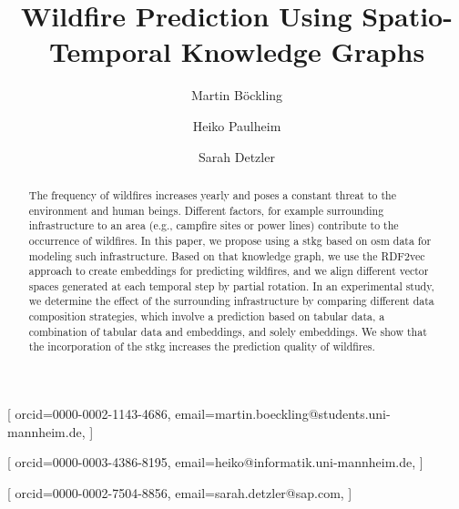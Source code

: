 \documentclass[
]{ceurart}
\begin{document}


\title{Wildfire Prediction Using Spatio-Temporal Knowledge Graphs}

\author[1,2]{Martin B\"ockling}[%
orcid=0000-0002-1143-4686,
email=martin.boeckling@students.uni-mannheim.de,
]
\cormark[1]
\fnmark[1]
\address[1]{University of Mannheim, Data and Web Science Group,
  B6, 26, 68161 Mannheim}
\address[2]{SAP SE,
  Dietmar-Hopp-Allee 16, 69190 Walldorf}

\author[1]{Heiko Paulheim}[%
orcid=0000-0003-4386-8195,
email=heiko@informatik.uni-mannheim.de,
]
\cormark[1]
\fnmark[1]

\author[2]{Sarah Detzler}[%
orcid=0000-0002-7504-8856,
email=sarah.detzler@sap.com,
]
\cormark[1]
\fnmark[1]


\begin{abstract}
  The frequency of wildfires increases yearly and poses a constant threat to the environment and human beings. Different factors, for example surrounding infrastructure to an area (e.g., campfire sites or power lines) contribute to the occurrence of wildfires. In this paper, we propose using a \gls*{stkg} based on \gls*{osm} data for modeling such infrastructure. Based on that knowledge graph, we use the RDF2vec approach to create embeddings for predicting wildfires, and we align different vector spaces generated at each temporal step by partial rotation. In an experimental study, we determine the effect of the surrounding infrastructure by comparing different data composition strategies, which involve a prediction based on tabular data, a combination of tabular data and embeddings, and solely embeddings. We show that the incorporation of the \gls*{stkg} increases the prediction quality of wildfires.
\end{abstract}
\end{document}
